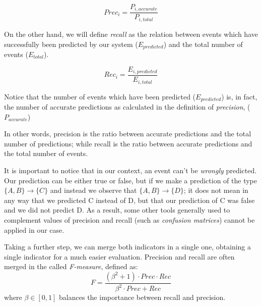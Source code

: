 \documentclass[a4paper,12pt]{article}
\begin{document}
\begin{equation}
Prec_i = \dfrac{ P_{i, accurate}}{ P_{i, total} }
\end{equation}

On the other hand, we will define \emph{recall} as the relation between events which have successfully been predicted by our system ($E_{predicted}$) and the total number of events ($E_{total}$). 

\begin{equation}
Rec_i = \dfrac{ E_{i, predicted}}{ E_{i, total} }
\end{equation}

Notice that the number of events which have been predicted ($E_{predicted}$) is, in fact, the number of accurate predictions as calculated in the definition of \emph{precision}, ($P_{accurate}$)

In other words, precision is the ratio between accurate predictions and the total number of predictions; while recall is the ratio between accurate predictions and the total number of events.

It is important to notice that in our context, an event can't be \emph{wrongly} predicted. Our prediction can be either true or false, but if we make a prediction of the type $\{A, B\} \longrightarrow \{C\}$ and instead we observe that $\{A, B\} \longrightarrow \{D\}$; it does not mean in any way that we predicted C instead of D, but that our prediction of C was false and we did not predict D. As a result, some other tools generally used to complement values of precision and recall (such as \emph{confusion matrices}) cannot be applied in our case.

Taking a further step, we can merge both indicators in a single one, obtaining a single indicator for a much easier evaluation. Precision and recall are often merged in the called \emph{F-measure}, defined as:
\begin{equation}
F = \dfrac{(\beta^{2}+1) \cdot Prec \cdot Rec}{\beta^{2} \cdot Prec+Rec}
\end{equation}
where $\beta\in [0,1]$ balances the importance between recall and precision.
\end{document}
